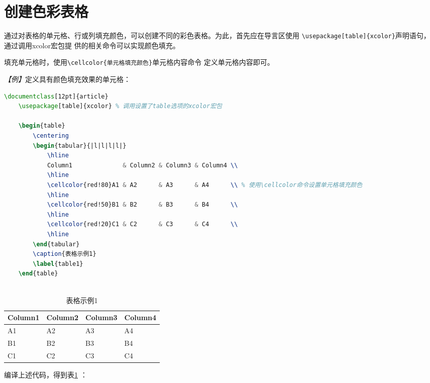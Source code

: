 \section{创建色彩表格}
通过对表格的单元格、行或列填充颜色，可以创建不同的彩色表格。为此，首先应在导言区使用
\texttt{\textbackslash{}usepackage[table]\{xcolor\}}声明语句，通过调用xcolor宏包提
供的相关命令可以实现颜色填充。

填充单元格时，使用\texttt{\textbackslash{}cellcolor\{单元格填充颜色\}}单元格内容命令
定义单元格内容即可。

\emph{【例】}定义具有颜色填充效果的单元格：
\begin{lstlisting}[language=TeX]
    \documentclass[12pt]{article}
    \usepackage[table]{xcolor} % 调用设置了table选项的xcolor宏包
    
    \begin{table}
        \centering
        \begin{tabular}{|l|l|l|l|}
            \hline
            Column1              & Column2 & Column3 & Column4 \\
            \hline
            \cellcolor{red!80}A1 & A2      & A3      & A4      \\ % 使用\cellcolor命令设置单元格填充颜色
            \hline
            \cellcolor{red!50}B1 & B2      & B3      & B4      \\
            \hline
            \cellcolor{red!20}C1 & C2      & C3      & C4      \\
            \hline
        \end{tabular}
        \caption{表格示例1}
        \label{table1}
    \end{table}
    
\end{lstlisting}

\begin{table}
    \centering
    \begin{tabular}{|l|l|l|l|}
        \hline
        Column1              & Column2 & Column3 & Column4 \\
        \hline
        \cellcolor{red!80}A1 & A2      & A3      & A4      \\ %
        \hline
        \cellcolor{red!50}B1 & B2      & B3      & B4      \\
        \hline
        \cellcolor{red!20}C1 & C2      & C3      & C4      \\
        \hline
    \end{tabular}
    \caption{表格示例1}
    \label{table1}
\end{table}
编译上述代码，得到表\ref{table1} ：

